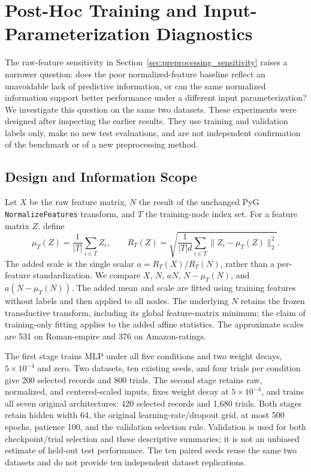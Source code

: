 \section{Post-Hoc Training and Input-Parameterization Diagnostics}
\label{app:training_diagnostics}

The raw-feature sensitivity in Section~\ref{sec:preprocessing_sensitivity} raises a narrower question: does the poor normalized-feature baseline reflect an unavoidable lack of predictive information, or can the same normalized information support better performance under a different input parameterization? We investigate this question on the same two datasets. These experiments were designed after inspecting the earlier results. They use training and validation labels only, make no new test evaluations, and are not independent confirmation of the benchmark or of a new preprocessing method.

\subsection{Design and Information Scope}

Let $X$ be the raw feature matrix, $N$ the result of the unchanged PyG \texttt{NormalizeFeatures} transform, and $T$ the training-node index set. For a feature matrix $Z$, define
\[
  \mu_T(Z)=\frac{1}{|T|}\sum_{i\in T}Z_i,
  \qquad
  R_T(Z)=\sqrt{\frac{1}{|T|d}\sum_{i\in T}\|Z_i-\mu_T(Z)\|_2^2}.
\]
The added scale is the single scalar $a=R_T(X)/R_T(N)$, rather than a per-feature standardization. We compare $X$, $N$, $aN$, $N-\mu_T(N)$, and $a(N-\mu_T(N))$. The added mean and scale are fitted using training features without labels and then applied to all nodes. The underlying $N$ retains the frozen transductive transform, including its global feature-matrix minimum; the claim of training-only fitting applies to the added affine statistics. The approximate scales are 531 on Roman-empire and 376 on Amazon-ratings.

The first stage trains MLP under all five conditions and two weight decays, $5\times10^{-4}$ and zero. Two datasets, ten existing seeds, and four trials per condition give 200 selected records and 800 trials. The second stage retains raw, normalized, and centered-scaled inputs, fixes weight decay at $5\times10^{-4}$, and trains all seven original architectures: 420 selected records and 1,680 trials. Both stages retain hidden width 64, the original learning-rate/dropout grid, at most 500 epochs, patience 100, and the validation selection rule. Validation is used for both checkpoint/trial selection and these descriptive summaries; it is not an unbiased estimate of held-out test performance. The ten paired seeds reuse the same two datasets and do not provide ten independent dataset replications.

